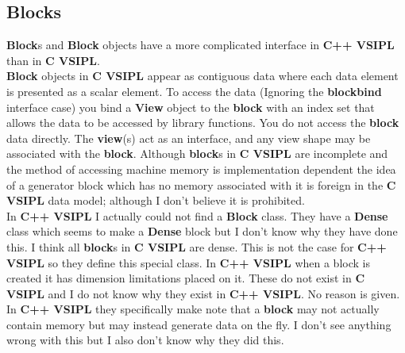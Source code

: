 \documentclass[11pt, oneside]{article}
\newcommand{\cvl}{\ttbf{C VSIPL}}
\newcommand{\cvpp}{\ttbf{C++ VSIPL}}
\newcommand{\ttbf}[1]{{\ttfamily \bfseries #1}}
\newcommand{\Blk}{\ttbf{Block}}
\newcommand{\blk}{\ttbf{block}}
\newcommand{\Vw}{\ttbf{View}}
\newcommand{\vw}{\ttbf{view}}
\begin{document}
\subsection{Blocks}
\Blk{}s and \Blk{} objects have a more complicated interface in \cvpp{} than in \cvl{}. 
\\[6pt]
\ttbf{Block} objects in \cvl{} appear as contiguous data where each data element is presented as a scalar element.  To access the data (Ignoring the \ttbf{blockbind} interface case) you bind a \Vw{} object to the \blk{} with an index set that allows the data to be accessed by library functions. You do not access the \blk{} data directly. The \vw{}(s) act as an interface, and any view shape may be associated with the \blk{}.  Although \blk{}s in \cvl{} are incomplete and the method of accessing machine memory is implementation dependent the idea of a generator block which has no memory associated with it is foreign in the \cvl{} data model; although I don't believe it is prohibited.
\\[6pt]
In \cvpp{} I actually could not find a \Blk{} class.  They have a \ttbf{Dense} class which seems to make a \ttbf{Dense} block but I don't know why they have done this.  I think all \blk{}s in \cvl{} are dense.  This is not the case for \cvpp{} so they define this special class. In \cvpp{} when a block is created it has dimension limitations placed on it.  These do not exist in \cvl{} and I do not know why they exist in \cvpp{}. No reason is given.
\\[6pt]
In \cvpp{} they specifically make note that a \blk{} may not actually contain memory but may instead generate data on the fly.  I don't see anything wrong with this but I also don't know why they did this.
\end{document}
